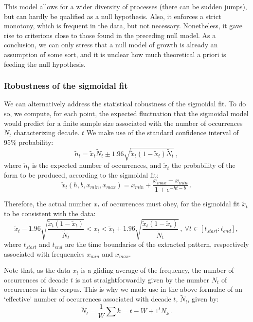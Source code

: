 \documentclass[12pt,twocolumn,amsmath,amssymb,aps,longbibliography]{revtex4-1}  %
\begin{document}
This model allows for a wider diversity of processes (there can be sudden jumps), but can hardly be qualified as a null hypothesis. Also, it enforces a strict monotony, which is frequent in the data, but not necessary. Nonetheless, it gave rise to criterions close to those found in the preceding null model. As a conclusion, we can only stress that a null model of growth is already an assumption of some sort, and it is unclear how much theoretical a priori is feeding the null hypothesis.


\subsubsection{Robustness of the sigmoidal fit \label{section:robustness}}

We can alternatively address the statistical robustness of the sigmoidal fit. To do so, we compute, for each point, the expected fluctuation that the sigmoidal model would predict for a finite sample size associated with the number of occurrences $\tilde{N}_t$ characterizing decade. $t$ We make use of the standard confidence interval of 95\% probability:
\begin{equation} \label{eq:fluctu}
\tilde{n}_t =  \tilde{x}_t \tilde{N}_t \pm 1.96 \sqrt{\displaystyle \tilde{x}_t ( 1- \tilde{x}_t) \tilde{N}_t} \, ,
\end{equation}
where $\tilde{n}_t$ is the expected number of occurrences, and $\tilde{x}_t$ the probability of the form to be produced, according to the sigmoidal fit:
\begin{equation}
\tilde{x}_t (h,b,x_{min},x_{max}) = x_{min} + \frac{x_{max}-x_{min}}{1 + e^{-ht -b}} \, .
\end{equation}

Therefore, the actual number $x_t$ of occurrences must obey, for the sigmoidal fit $\tilde{x}_t$ to be consistent with the data:
\begin{equation}\label{eq:check}
 \tilde{x}_t - 1.96 \sqrt{\frac{\displaystyle \tilde{x}_t ( 1- \tilde{x}_t)}{\displaystyle \tilde{N}_t}} < x_t < \tilde{x}_t + 1.96 \sqrt{\frac{\displaystyle \tilde{x}_t ( 1- \tilde{x}_t)}{\displaystyle \tilde{N}_t}} \, , \ \forall t \in [t_{start}:t_{end}] ,
\end{equation}
where $t_{start}$ and $t_{end}$ are the time boundaries of the extracted pattern, respectively associated with frequencies $x_{min}$ and $x_{max}$. 

Note that, as the data $x_t$ is a gliding average of the frequency, the number of occurrences of decade $t$ is not straightforwardly given by the number $N_t$ of occurrences in the corpus. This is why we made use in the above formulae of an `effective' number of occurrences associated with decade $t$, $\tilde{N}_t$, given by:
\begin{equation}
\tilde{N}_t = \frac{1}{W}\sum \limits{k = t - W +1}^{t} N_k \, .
\end{equation}
\end{document}
